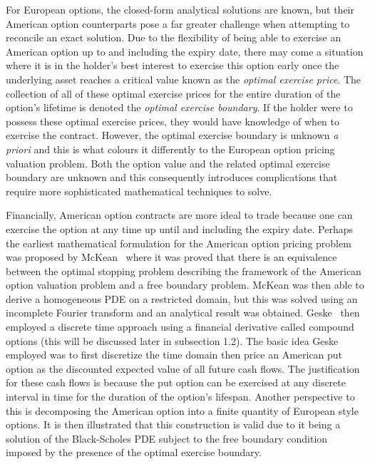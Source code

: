 For European options, the closed-form analytical solutions are known, but their American option counterparts pose a far greater challenge when attempting to reconcile an exact solution. Due to the flexibility of being able to exercise an American option up to and including the expiry date, there may come a situation where it is in the holder's best interest to exercise this option early once the underlying asset reaches a critical value known as the \emph{optimal exercise price}. The collection of all of these optimal exercise prices for the entire duration of the option's lifetime is denoted the \emph{optimal exercise boundary}. If the holder were to possess these optimal exercise prices, they would have knowledge of when to exercise the contract. However, the optimal exercise boundary is unknown \emph{a priori} and this is what colours it differently to the European option pricing valuation problem. Both the option value and the related optimal exercise boundary are unknown and this consequently introduces complications that require more sophisticated mathematical techniques to solve.

Financially, American option contracts are more ideal to trade because one can exercise the option at any time up until and including the expiry date. Perhaps the earliest mathematical formulation for the American option pricing problem was proposed by McKean~\cite{McKean1965} where it was proved that there is an equivalence between the optimal stopping problem describing the framework of the American option valuation problem and a free boundary problem. McKean was then able to derive a homogeneous PDE on a restricted domain, but this was solved using an incomplete Fourier transform and an analytical result was obtained. Geske~\cite{Geske1984} then employed a discrete time approach using a financial derivative called compound options (this will be discussed later in subsection 1.2). The basic idea Geske employed was to first discretize the time domain then price an American put option as the discounted expected value of all future cash flows. The justification for these cash flows is because the put option can be exercised at any discrete interval in time for the duration of the option's lifespan. Another perspective to this is decomposing the American option into a finite quantity of European style options. It is then illustrated that this construction is valid due to it being a solution of the Black-Scholes PDE subject to the free boundary condition imposed by the presence of the optimal exercise boundary.

